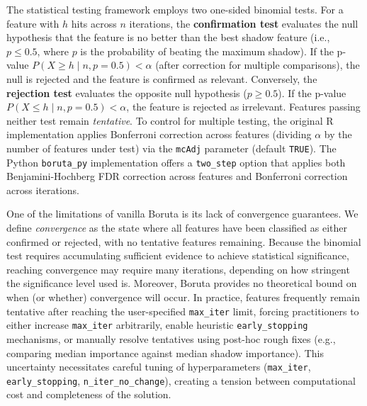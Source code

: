 \documentclass[runningheads]{llncs}
\newcommand{\writeme}[1]{\todo[inline,color=yellow!40]{WRITE: #1}}
\begin{document}
The statistical testing framework employs two one-sided binomial tests. For a feature with $h$ hits across $n$ iterations, the \textbf{confirmation test} evaluates the null hypothesis that the feature is no better than the best shadow feature (i.e., $p \leq 0.5$, where $p$ is the probability of beating the maximum shadow). If the p-value $P(X \geq h \mid n, p=0.5) < \alpha$ (after correction for multiple comparisons), the null is rejected and the feature is confirmed as relevant. Conversely, the \textbf{rejection test} evaluates the opposite null hypothesis ($p \geq 0.5$). If the p-value $P(X \leq h \mid n, p=0.5) < \alpha$, the feature is rejected as irrelevant. Features passing neither test remain \emph{tentative}. To control for multiple testing, the original R implementation applies Bonferroni correction across features (dividing $\alpha$ by the number of features under test) via the \texttt{mcAdj} parameter (default \texttt{TRUE}). The Python \texttt{boruta\_py} implementation offers a \texttt{two\_step} option that applies both Benjamini-Hochberg FDR correction across features and Bonferroni correction across iterations.


One of the limitations of vanilla Boruta is its lack of convergence guarantees. We define \emph{convergence} as the state where all features have been classified as either confirmed or rejected, with no tentative features remaining. Because the binomial test requires accumulating sufficient evidence to achieve statistical significance, reaching convergence may require many iterations, depending on how stringent the significance level used is. Moreover, Boruta provides no theoretical bound on when (or whether) convergence will occur. In practice, features frequently remain tentative after reaching the user-specified \texttt{max\_iter} limit, forcing practitioners to either increase \texttt{max\_iter} arbitrarily, enable heuristic \texttt{early\_stopping} mechanisms, or manually resolve tentatives using post-hoc rough fixes (e.g., comparing median importance against median shadow importance). This uncertainty necessitates careful tuning of hyperparameters (\texttt{max\_iter}, \texttt{early\_stopping}, \texttt{n\_iter\_no\_change}), creating a tension between computational cost and completeness of the solution.
\end{document}
